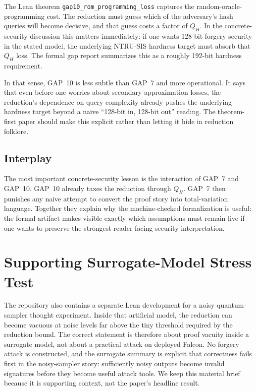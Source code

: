 \documentclass[11pt]{article}
\begin{document}
The Lean theorem \texttt{gap10\_rom\_programming\_loss} captures the random-oracle-programming cost. The reduction must guess which of the adversary's hash queries will become decisive, and that guess costs a factor of $Q_H$. In the concrete-security discussion this matters immediately: if one wants 128-bit forgery security in the stated model, the underlying NTRU-SIS hardness target must absorb that $Q_H$ loss. The formal gap report summarizes this as a roughly 192-bit hardness requirement.

In that sense, GAP~10 is less subtle than GAP~7 and more operational. It says that even before one worries about secondary approximation losses, the reduction's dependence on query complexity already pushes the underlying hardness target beyond a naive ``128-bit in, 128-bit out'' reading. The theorem-first paper should make this explicit rather than letting it hide in reduction folklore.

\subsection*{Interplay}

The most important concrete-security lesson is the interaction of GAP~7 and GAP~10. GAP~10 already taxes the reduction through $Q_H$. GAP~7 then punishes any naive attempt to convert the proof story into total-variation language. Together they explain why the machine-checked formalization is useful: the formal artifact makes visible exactly which assumptions must remain live if one wants to preserve the strongest reader-facing security interpretation.

\section{Supporting Surrogate-Model Stress Test}

The repository also contains a separate Lean development for a noisy quantum-sampler thought experiment. Inside that artificial model, the reduction can become vacuous at noise levels far above the tiny threshold required by the reduction bound. The correct statement is therefore about proof vacuity inside a surrogate model, not about a practical attack on deployed Falcon. No forgery attack is constructed, and the surrogate summary is explicit that correctness fails first in the noisy-sampler story: sufficiently noisy outputs become invalid signatures before they become useful attack tools. We keep this material brief because it is supporting context, not the paper's headline result.
\end{document}
